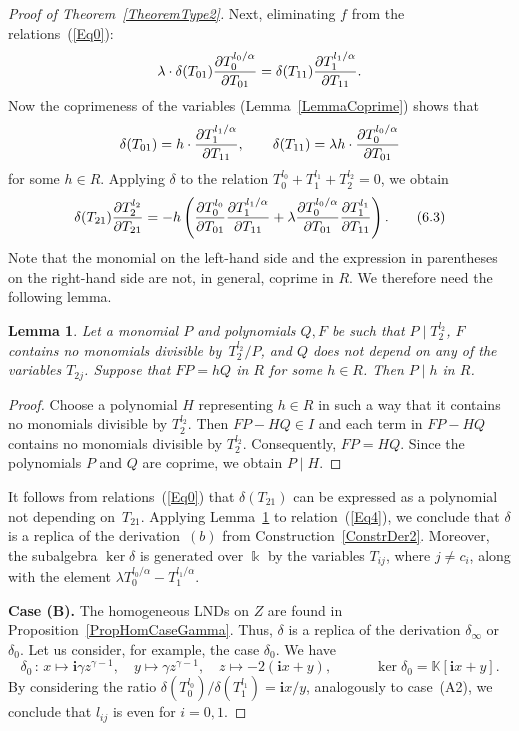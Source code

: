 \documentclass[a4paper,reqno,12pt]{amsart}
\theoremstyle{plain}
\theoremstyle{definition}
\theoremstyle{plain}
\newtheorem{lemma}[theorem]{Lemma}
\theoremstyle{remark}
\newcommand{\KK}{\mathbb K}
\newcommand{\ii}{\mathbf{i}}
\begin{document}
\begin{proof}[Proof of Theorem~\ref{TheoremType2}]
    Next, eliminating $f$ from the relations~(\ref{Eq0}):
    $$
    \lambda\cdot\delta(T_{01}) {\partial T_0^{l_0/\alpha}\over\partial T_{01}} = \delta(T_{11}) {\partial T_1^{l_1/\alpha}\over\partial T_{11}}.
    $$
    Now the coprimeness of the variables (Lemma~\ref{LemmaCoprime}) shows that
    $$
    \delta(T_{01})= h\cdot {\partial T_1^{l_1/\alpha}\over\partial T_{11}},\qquad \delta(T_{11})= \lambda h \cdot {\partial T_0^{l_0/\alpha}\over\partial T_{01}}
    $$
    for some $h\in R$. Applying $\delta$ to the relation $T_0^{l_0}+T_1^{l_1}+T_2^{l_2}=0$, we obtain
    \begin{equation}\label{Eq4}
        \delta(T_{21}){\partial T_2^{l_2}\over\partial T_{21}} =- h \left( {\partial T_0^{l_0}\over\partial T_{01}}{\partial T_1^{l_1/\alpha}\over\partial T_{11}} +\lambda {\partial T_0^{l_0/\alpha}\over\partial T_{01}} {\partial T_1^{l_1}\over\partial T_{11}}\right).
        \tag{6.3}
    \end{equation}
    Note that the monomial on the left-hand side and the expression in parentheses on the right-hand side are not, in general, coprime in $R$. We therefore need the following lemma.
    \begin{lemma}\label{LemmaQuasiCoprime}
        Let a monomial $P$ and polynomials $Q, F$ be such that $P\mid T_2^{l_2}$, $F$ contains no monomials divisible by~$T_2^{l_2}/P$, and $Q$ does not depend on any of the variables $T_{2j}$.  Suppose that $FP=hQ$ in $R$ for some $h\in R$. Then $P\mid h$ in $R$.
        \end{lemma}
        \begin{proof}
            Choose a polynomial $H$ representing $h\in R$ in such a way that it contains no monomials divisible by $T_2^{l_2}$. Then
            $
           FP-HQ\in I
            $
            and each term in $FP-HQ$ contains no monomials divisible by $T_2^{l_2}$. Consequently,
            $FP=HQ.$ Since the polynomials $P$ and $Q$ are coprime, we obtain $P\mid H$.
        \end{proof}
    It follows from relations~(\ref{Eq0}) that $\delta(T_{21})$ can be expressed as a polynomial not depending on~$T_{21}$.
    Applying Lemma~\ref{LemmaQuasiCoprime} to relation~(\ref{Eq4}), we conclude that $\delta$ is a replica of the derivation~$(b)$ from Construction~\ref{ConstrDer2}.
    Moreover, the subalgebra $\ker\delta$
    is generated over $\Bbbk$ by the variables $T_{ij}$, where $j\neq c_i$, along with the element $\lambda{ T_0^{l_0/\alpha}}-{T_{1}^{l_1/\alpha}}$.

    \textbf{Case (B).}
    The homogeneous LNDs on $Z$ are found in Proposition~\ref{PropHomCaseGamma}. Thus, $\delta$ is a replica of the derivation $\delta_{\infty}$ or $\delta_0$. Let us consider, for example, the case $\delta_0$. We have
    $$
    \delta_{0}\,\colon\,x\longmapsto \ii\gamma z^{\gamma-1},\quad y\longmapsto \gamma z^{\gamma-1},\quad z\longmapsto -2(\ii x+y),\quad\qquad\ker\delta_0=\KK[\ii x+y].
    $$
    By considering the ratio $\delta(T_0^{l_0})/\delta(T_1^{l_1}) = \ii x/y$, analogously to case~(A2), we conclude that $l_{ij}$ is even for $i=0,1$.


\end{proof}
\end{document}
